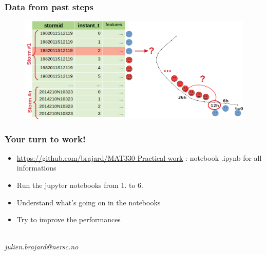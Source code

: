 \documentclass[handout]{beamer}
\begin{document}
\begin{frame}
\frametitle{Data from \textbf{past} steps}
\begin{figure}
	\includegraphics[width=0.95\linewidth]{fig/L1/data_lookahead3.png} \\
\end{figure}

\end{frame}

\begin{frame}


\frametitle{Your turn to work!}
\begin{itemize}
\item \url{https://github.com/brajard/MAT330-Practical-work} :
notebook .ipynb for all informations
 \\
 \item Run the jupyter notebooks from 1. to 6.
 \item Understand what's going on in the notebooks
 \item Try to improve the performances
\end{itemize}

\textit{\\ julien.brajard@nersc.no}

\end{frame}
\end{document}
